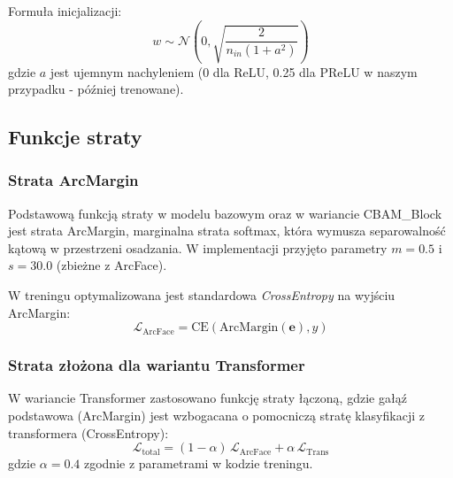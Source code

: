 Formuła inicjalizacji:
\begin{equation}
w \sim \mathcal{N}(0, \sqrt{\frac{2}{n_{in}(1 + a^2)}})
\end{equation}
gdzie $a$ jest ujemnym nachyleniem (0 dla ReLU, 0.25 dla PReLU w naszym przypadku - później trenowane).

\subsection{Funkcje straty}
\label{subsec:loss}

\subsubsection{Strata ArcMargin}
Podstawową funkcją straty w modelu bazowym oraz w wariancie CBAM\_Block jest strata ArcMargin, marginalna strata softmax, która wymusza separowalność kątową w przestrzeni osadzania. W implementacji przyjęto parametry $m=0.5$ i $s=30.0$ (zbieżne z ArcFace).

W treningu optymalizowana jest standardowa \textit{CrossEntropy} na wyjściu ArcMargin:
\begin{equation}
\mathcal{L}_{\text{ArcFace}} = \text{CE}(\text{ArcMargin}(\mathbf{e}), y)
\end{equation}

\subsubsection{Strata złożona dla wariantu Transformer}
W wariancie Transformer zastosowano funkcję straty łączoną, gdzie gałąź podstawowa (ArcMargin) jest wzbogacana o pomocniczą stratę klasyfikacji z transformera (CrossEntropy):
\begin{equation}
\mathcal{L}_{\text{total}} = (1-\alpha)\,\mathcal{L}_{\text{ArcFace}} + \alpha\,\mathcal{L}_{\text{Trans}}
\end{equation}
gdzie $\alpha = 0.4$ zgodnie z parametrami w kodzie treningu.